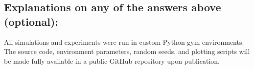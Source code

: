 \documentclass[manuscript, screen, review]{jair}
\begin{document}
\subsection*{Explanations on any of the answers above (optional):}

All simulations and experiments were run in custom Python gym environments. The source code, environment parameters, random seeds, and plotting scripts will be made fully available in a public GitHub repository upon publication.
\end{document}
